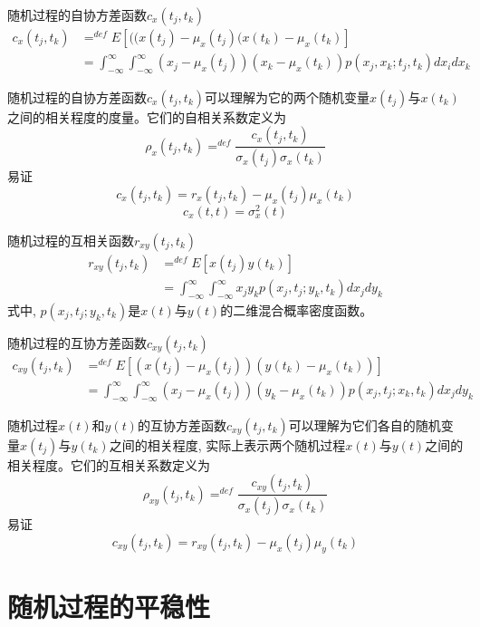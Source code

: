 \begin{frame}
\begin{block}{随机过程的自协方差函数$c_x(t_j,t_k)$}
	\begin{align*}
	c_x(t_j,t_k)&\mathop{=}^{def}E[((x(t_j)-\mu_x(t_j)(x(t_k)-\mu_x(t_k)]\\
	&=\int_{-\infty}^{\infty}\int_{-\infty}^{\infty}(x_j-\mu_x(t_j))(x_k-\mu_x(t_k))p(x_j,x_k;t_j,t_k)dx_idx_k
	\end{align*}
\end{block}
	随机过程的自协方差函数$c_x(t_j,t_k)$可以理解为它的两个随机变量$x(t_j)$与$x(t_k)$之间的相关程度的度量。它们的自相关系数定义为
\[\rho_x(t_j,t_k)\mathop{=}^{def}\frac{c_x(t_j,t_k)}{\sigma_x(t_j)\sigma_x(t_k)}\]
易证
\[c_x(t_j,t_k)=r_x(t_j,t_k)-\mu_x(t_j)\mu_x(t_k)\]
\[c_x(t,t)=\sigma_x^2(t)\]
\end{frame}

\begin{frame}
\begin{block}{随机过程的互相关函数$r_{xy}(t_j,t_k)$}
	\begin{align*}
	r_{xy}(t_j,t_k) &\mathop{=}^{def}E[x(t_j)y(t_k)]\\
	&=\int_{-\infty}^{\infty}\int_{-\infty}^{\infty}x_jy_kp(x_j,t_j;y_k,t_k)dx_jdy_k
	\end{align*}
	式中, $p(x_j,t_j;y_k,t_k)$是$x(t)$与$y(t)$的二维混合概率密度函数。
\end{block}
\end{frame}

\begin{frame}
\begin{block}{随机过程的互协方差函数$c_{xy}(t_j,t_k)$}
\begin{align*}
c_{xy}(t_j,t_k)&\mathop{=}^{def}E[(x(t_j)-\mu_x(t_j))(y(t_k)-\mu_x(t_k))]\\
&=\int_{-\infty}^{\infty}\int_{-\infty}^{\infty}(x_j-\mu_x(t_j))(y_k-\mu_x(t_k))p(x_j,t_j;x_k,t_k)dx_jdy_k
\end{align*}
\end{block}
随机过程$x(t)$和$y(t)$的互协方差函数$c_{xy}(t_j,t_k)$可以理解为它们各自的随机变量$x(t_j)$与$y(t_k)$之间的相关程度, 实际上表示两个随机过程$x(t)$与$y(t)$之间的相关程度。它们的互相关系数定义为
\[\rho_{xy}(t_j,t_k)\mathop{=}^{def}\frac{c_{xy}(t_j,t_k)}{\sigma_x(t_j)\sigma_x(t_k)}\]
易证
\[c_{xy}(t_j,t_k)=r_{xy}(t_j,t_k)-\mu_x(t_j)\mu_y(t_k)\]
\end{frame}

\section{随机过程的平稳性}

